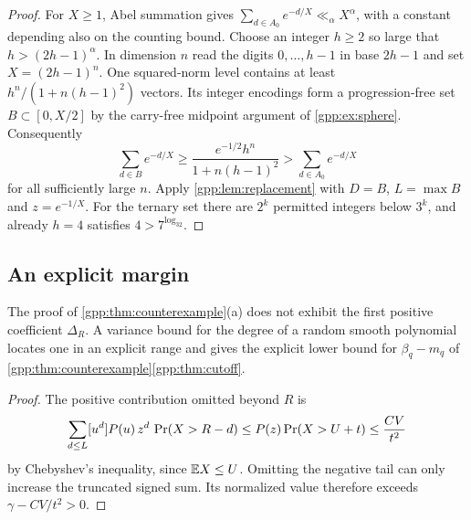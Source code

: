 \begin{proof}
For $X\ge1$, Abel summation gives $\sum_{d\in A_0}e^{-d/X}\ll_\alpha X^\alpha$, with a
constant depending also on the counting bound. Choose an integer $h\ge2$ so large that
$h>(2h-1)^\alpha$. In dimension $n$ read the digits $0,\ldots,h-1$ in base $2h-1$ and set
$X=(2h-1)^n$. One squared-norm level contains at least $h^n/(1+n(h-1)^2)$ vectors. Its
integer encodings form a progression-free set $B\subset[0,X/2]$ by the carry-free
midpoint argument of \cref{gpp:ex:sphere}. Consequently
\[
 \sum_{d\in B}e^{-d/X}\ge\frac{e^{-1/2}h^n}{1+n(h-1)^2}>\sum_{d\in A_0}e^{-d/X}
\]
for all sufficiently large $n$. Apply \cref{gpp:lem:replacement} with $D=B$,
$L=\max B$ and $z=e^{-1/X}$. For the ternary set there are $2^k$ permitted integers
below $3^k$, and already $h=4$ satisfies $4>7^{\log_32}$.
\end{proof}

\subsection{An explicit margin}\label{gpp:sec:margin}
{\raggedright{}}

The proof of \cref{gpp:thm:counterexample}(a) does not exhibit the first positive
coefficient $\Delta_R$. A variance bound for the degree of a random smooth polynomial
locates one in an explicit range and gives the explicit lower bound for $\beta_q-m_q$ of
\cref{gpp:thm:counterexample}\ref{gpp:thm:cutoff}.


\begin{proof}
The positive contribution omitted beyond $R$ is
\[
 \sum_{d\le L}[u^d]P(u)\,z^d\,\operatorname{Pr}(X>R-d)\le P(z)\operatorname{Pr}(X>U+t)\le\frac{CV}{t^2}
\]
by Chebyshev's inequality, since $\mathbb{E} X\le U$. Omitting the negative tail can only
increase the truncated signed sum. Its normalized value therefore exceeds
$\gamma-CV/t^2>0$.
\end{proof}

